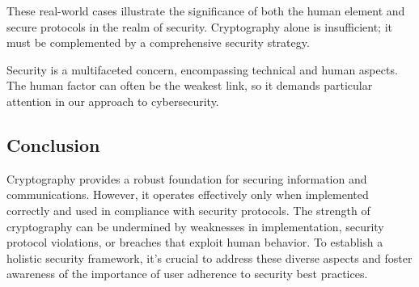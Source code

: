 \documentclass{class}
\begin{document}
These real-world cases illustrate the significance of both the human element and secure protocols in the realm of security. Cryptography alone is insufficient; it must be complemented by a comprehensive security strategy.

Security is a multifaceted concern, encompassing technical and human aspects. The human factor can often be the weakest link, so it demands particular attention in our approach to cybersecurity.

\subsection{Conclusion}

Cryptography provides a robust foundation for securing information and communications. However, it operates effectively only when implemented correctly and used in compliance with security protocols. The strength of cryptography can be undermined by weaknesses in implementation, security protocol violations, or breaches that exploit human behavior. To establish a holistic security framework, it's crucial to address these diverse aspects and foster awareness of the importance of user adherence to security best practices.
\end{document}

